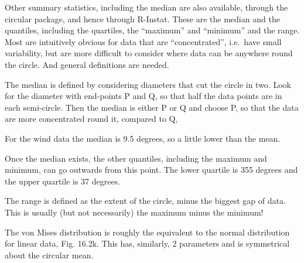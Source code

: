 \documentclass[
  letterpaper,
  DIV=11,
  numbers=noendperiod]{scrreprt}
\begin{document}
Other summary statistics, including the median are also available,
through the circular package, and hence through R-Instat. These are the
median and the quantiles, including the quartiles, the ``maximum'' and
``minimum'' and the range. Most are intuitively obvious for data that
are ``concentrated'', i.e.~have small variability, but are more
difficult to consider where data can be anywhere round the circle. And
general definitions are needed.

The median is defined by considering diameters that cut the circle in
two. Look for the diameter with end-points P and Q, so that half the
data points are in each semi-circle. Then the median is either P or Q
and choose P, so that the data are more concentrated round it, compared
to Q,

For the wind data the median is 9.5 degrees, so a little lower than the
mean.

Once the median exists, the other quantiles, including the maximum and
minimum, can go outwards from this point. The lower quartile is 355
degrees and the upper quartile is 37 degrees.

The range is defined as the extent of the circle, minus the biggest gap
of data. This is usually (but not necessarily) the maximum minus the
minimum!

The von Mises distribution is roughly the equivalent to the normal
distribution for linear data, Fig. 16.2k. This has, similarly, 2
parameters and is symmetrical about the circular mean.
\end{document}
